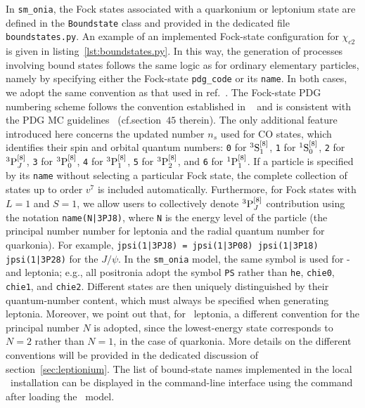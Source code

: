 In \texttt{sm\_onia}, the Fock states associated with a quarkonium or leptonium state are defined in the \texttt{Boundstate} class and provided in the dedicated file \texttt{boundstates.py}. An example of an implemented Fock-state configuration for $\chi_{c2}$ is given in listing~\ref{lst:boundstates.py}.
In this way, the generation of processes involving bound states follows the same logic as for ordinary elementary particles, namely by specifying either the Fock-state \texttt{pdg\_code} or its \texttt{name}. In both cases, we adopt the same convention as that used in ref.~\cite{ColpaniSerri:2025vdz}.
The Fock-state PDG numbering scheme follows the convention established in ~\cite{Bierlich:2022pfr} and is consistent with the PDG MC guidelines~\cite{ParticleDataGroup:2024cfk} (cf.\@ section~$45$ therein). 
The only additional feature introduced here concerns the updated number $n_s$ used for CO states, which identifies their spin and orbital quantum numbers: \texttt{0} for $^3\mathrm{S}_1^{[8]}$, \texttt{1} for $^1\mathrm{S}_0^{[8]}$, \texttt{2} for $^3\mathrm{P}_J^{[8]}$, \texttt{3} for $^3\mathrm{P}_0^{[8]}$, \texttt{4} for $^3\mathrm{P}_1^{[8]}$, \texttt{5} for $^3\mathrm{P}_2^{[8]}$, and \texttt{6} for $^1\mathrm{P}_1^{[8]}$.
If a particle is specified by its {\tt name} without selecting a particular Fock state, the complete collection of states up to order $v^7$ is included automatically. Furthermore, for Fock states with $L=1$ and $S=1$, we allow users to collectively denote ${}^{3}\mathrm{P}_J^{[8]}$ contribution using the notation \texttt{name(N|3PJ8)}, where \texttt{N} is the energy level of the particle (the principal number number for leptonia and the radial quantum number for quarkonia). For example, \texttt{jpsi(1|3PJ8) = jpsi(1|3P08) jpsi(1|3P18) jpsi(1|3P28)} for the $J/\psi$.
In the {\tt sm\_onia} model, the same symbol is used for {\swave}- and {\pwavetxt} leptonia; e.g., all {\pwavetxt} positronia adopt the symbol {\tt PS} rather than {\tt he}, {\tt chie0}, {\tt chie1}, and {\tt chie2}.  
Different states are then uniquely distinguished by their quantum-number content, which must always be specified when generating leptonia. Moreover, we point out that, for \pwavetxt\ leptonia, a different convention for the principal number $N$ is adopted, since the lowest-energy state corresponds to $N=2$ rather than $N=1$, in the case of quarkonia. More details on the different conventions will be provided in the dedicated discussion of section~\ref{sec:leptionium}.
The list of bound-state names implemented in the local \mgshort\ installation can be displayed in the command-line interface using the command
\noindent
after loading the \ufo\ model.


